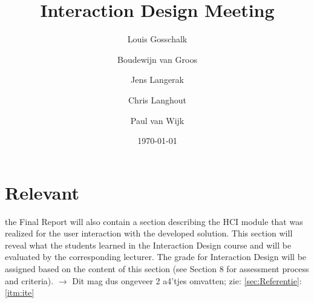 \documentclass[a4paper]{article}
\title{Interaction Design Meeting}
\author[1]{Louis Gosschalk}
\author[2]{Boudewijn van Groos}
\author[3]{Jens Langerak}
\author[4]{Chris Langhout}
\author[5]{Paul van Wijk}
\affil[1]{lgosschalk \\
4214528}
\affil[2]{bvangroos \\
4229843}
\affil[3]{jlangerak \\
4317327}
\affil[4]{clanghout \\
4281705}
\affil[5]{pvanwijk \\
4285034}
\affil[ ]{Health Informatics Group C}
\date{\today}
\begin{document}
\maketitle

\section{Relevant}
the Final Report will also
contain a section describing the HCI module that was realized for the user interaction with
the developed solution. This section will reveal what the students learned in the Interaction
Design course and will be evaluated by the corresponding lecturer. The grade for Interaction
Design will be assigned based on the content of this section (see Section 8 for assessment
process and criteria). $\to$ Dit mag dus ongeveer 2 a4'tjes omvatten; zie: \ref{sec:Referentie}:\ref{itm:ite}
\end{document}
